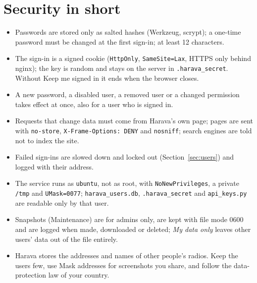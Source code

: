 \documentclass[10pt,a4paper]{article}
\newcommand{\ui}[1]{\textsf{\small #1}}
\begin{document}
\section{Security in short}\label{sec:security}
\begin{itemize}[leftmargin=1.2em]
\item Passwords are stored only as salted hashes (Werkzeug, scrypt); a one-time password must be changed at the first sign-in; at least 12 characters.
\item The sign-in is a signed cookie (\texttt{HttpOnly}, \texttt{SameSite=Lax}, HTTPS only behind nginx); the key is random and stays on the server in \texttt{.harava\_secret}. Without \ui{Keep me signed in} it ends when the browser closes.
\item A new password, a disabled user, a removed user or a changed permission takes effect at once, also for a user who is signed in.
\item Requests that change data must come from Harava's own page; pages are sent with \texttt{no-store}, \texttt{X-Frame-Options: DENY} and \texttt{nosniff}; search engines are told not to index the site.
\item Failed sign-ins are slowed down and locked out (Section~\ref{sec:users}) and logged with their address.
\item The service runs as \texttt{ubuntu}, not as root, with \texttt{NoNewPrivileges}, a private \texttt{/tmp} and \texttt{UMask=0077}; \texttt{harava\_users.db}, \texttt{.harava\_secret} and \texttt{api\_keys.py} are readable only by that user.
\item Snapshots (Maintenance) are for admins only, are kept with file mode 0600 and are logged when made, downloaded or deleted; \emph{My data only} leaves other users' data out of the file entirely.
\item Harava stores the addresses and names of other people's radios. Keep the users few, use \ui{Mask addresses} for screenshots you share, and follow the data-protection law of your country.
\end{itemize}

\end{document}
